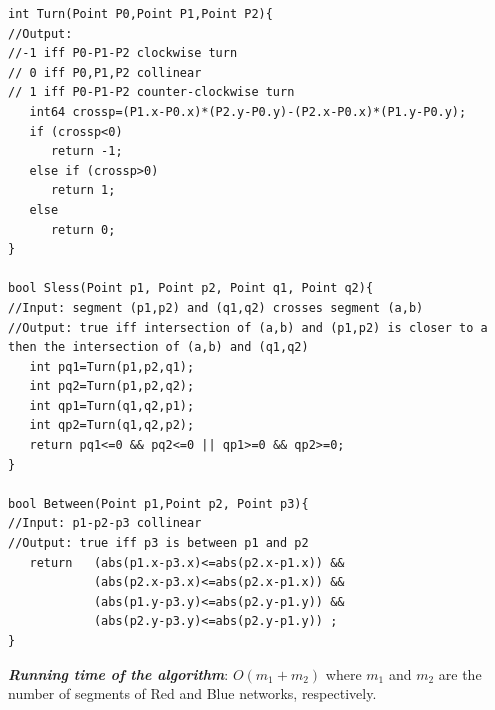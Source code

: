 \begin{lstlisting}
int Turn(Point P0,Point P1,Point P2){
//Output:
//-1 iff P0-P1-P2 clockwise turn
// 0 iff P0,P1,P2 collinear
// 1 iff P0-P1-P2 counter-clockwise turn
   int64 crossp=(P1.x-P0.x)*(P2.y-P0.y)-(P2.x-P0.x)*(P1.y-P0.y);
   if (crossp<0)
      return -1;
   else if (crossp>0)
      return 1;
   else
      return 0;
}

bool Sless(Point p1, Point p2, Point q1, Point q2){
//Input: segment (p1,p2) and (q1,q2) crosses segment (a,b)
//Output: true iff intersection of (a,b) and (p1,p2) is closer to a then the intersection of (a,b) and (q1,q2)
   int pq1=Turn(p1,p2,q1);
   int pq2=Turn(p1,p2,q2);
   int qp1=Turn(q1,q2,p1);
   int qp2=Turn(q1,q2,p2);
   return pq1<=0 && pq2<=0 || qp1>=0 && qp2>=0;
}

bool Between(Point p1,Point p2, Point p3){
//Input: p1-p2-p3 collinear
//Output: true iff p3 is between p1 and p2
   return   (abs(p1.x-p3.x)<=abs(p2.x-p1.x)) &&
            (abs(p2.x-p3.x)<=abs(p2.x-p1.x)) &&
            (abs(p1.y-p3.y)<=abs(p2.y-p1.y)) &&
            (abs(p2.y-p3.y)<=abs(p2.y-p1.y)) ;
}
\end{lstlisting}

\emph{\textbf{Running time of the algorithm}}: $O(m_1+m_2)$ where $m_1$ and $m_2$ are the number of segments of Red and Blue networks, respectively.

